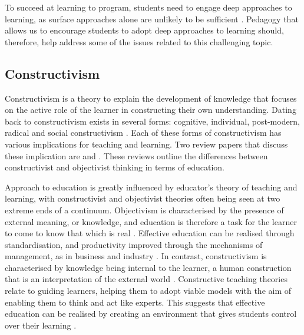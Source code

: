 To succeed at learning to program, students need to engage deep approaches to learning, as surface approaches alone are unlikely to be sufficient \cite{Bruce:2003}. Pedagogy that allows us to encourage students to adopt deep approaches to learning should, therefore, help address some of the issues related to this challenging topic.



\subsection{Constructivism} %
\label{sub:constructivism}

Constructivism is a theory to explain the development of knowledge that focuses on the active role of the learner in constructing their own understanding. Dating back to \citet{Piaget:1950} constructivism exists in several forms: cognitive, individual, post-modern, radical and social constructivism \cite{Phillips:1995,Steffe:1995}. Each of these forms of constructivism has various implications for teaching and learning. Two review papers that discuss these implication are \citet{Jonassen:1991} and \citet{Vrasidas:2000}. These reviews outline the differences between constructivist and objectivist thinking in terms of education.

Approach to education is greatly influenced by educator's theory of teaching and learning, with constructivist and objectivist theories often being seen at two extreme ends of a continuum. Objectivism is characterised by the presence of external meaning, or knowledge, and education is therefore a task for the learner to come to know that which is real \cite{Jonassen:1991,Vrasidas:2000}. Effective education can be realised through standardisation, and productivity improved through the mechanisms of management, as in business and industry \cite{Tyler:1969,Vrasidas:2000}. In contrast, constructivism is characterised by knowledge being internal to the learner, a human construction that is an interpretation of the external world \cite{Jonassen:1991,Vrasidas:2000}. Constructive teaching theories relate to guiding learners, helping them to adopt viable models with the aim of enabling them to think and act like experts. This suggests that effective education can be realised by creating an environment that gives students control over their learning \cite{Vrasidas:2000}. 

